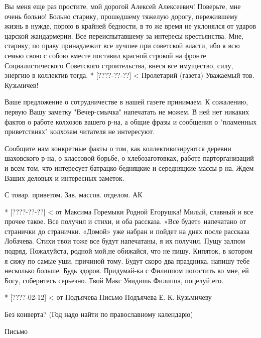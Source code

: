 \documentclass[]{memoir}
\begin{document}
Вы меня еще раз простите, мой дорогой Алексей Алексеевич! Поверьте, мне очень больно! Больно старику, прошедшему тяжелую дорогу, пережившему жизнь в нужде, порою в крайней бедности, в то же время не уклонялся от ударов царской жандармерии. Все переиспытавшему за интересы крестьянства. Мне, старику, по праву принадлежит все лучшее при советской власти, ибо я всю семью свою с собою вместе поставил красной строкой на фронте Социалистического Советского строительства, внеся все имущество, силу, энергию в коллектив тогда.
* [????-??-??] < Пролетарий (газета)
Уважаемый тов. Кузьмичев!

Ваше предложение о сотрудничестве в нашей газете принимаем. К сожалению, первую Вашу заметку "Вечер-смычка" напечатать не можем. В ней нет никаких фактов о работе колхозов вашего р-на, а общие фразы и сообщения о "пламенных приветствиях" колхозам читателя не интересуют.

Сообщите нам конкретные факты о том, как коллективизируются деревни шаховского р-на, о классовой борьбе, о хлебозаготовках, работе парторганизаций и всем том, что интересует батрацко-бедняцкие и середняцкие массы р-на.
Ждем Ваших деловых и интересных заметок.

С товар. приветом.
Зав. массов. отделом. АК

* [????-??-??] < от Максима Горемыки
                                Родной Егорушка!
Милый, славный и все прочее такое.
Все получил и стихи, и оба рассказа. «Все будет» напечатано от странички до странички. «Домой» уже набран и пойдет на днях после рассказа Лобачева. Стихи твои тоже все будут напечатаны, я их получил. Пущу залпом подряд. Пожалуйста, родной мой,не обижайся, что не пишу. Кипяток, в котором я сижу по самые уши, причиной тому. Будут скоро два праздника, напишу тебе несколько больше. Будь здоров.
   Придумай-ка с Филиппом погостить ко мне, ей Богу, соберитесь серьезно.
                    Твой Макс
Увидишь Филиппа, поцелуй его.

* [????-02-12] < от Подъячева
Письмо Подъячева Е. К. Кузьмичеву

Без конверта? (Год надо найти по православному календарю)

Письмо
\end{document}
